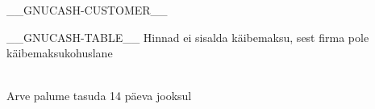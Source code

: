 \documentclass[paper=a4, pagesize, DIN, pagenumber=false, parskip=half, %
               firsthead=false, backaddress=false, subject=underlined, foldmarks=false, %
               fromalign=off, fromphone=false, %
               fromemail=false, fromurl=false, %
               fromlogo=false, fromrule=true]{scrlttr2}
\begin{document}

\begin{letter}{__GNUCASH-CUSTOMER__}

\opening{}

__GNUCASH-TABLE__
Hinnad ei sisalda käibemaksu, sest firma pole käibemaksukohuslane
\\
\\

\closing{Arve palume tasuda 14 päeva jooksul}

\end{letter}
\end{document}
